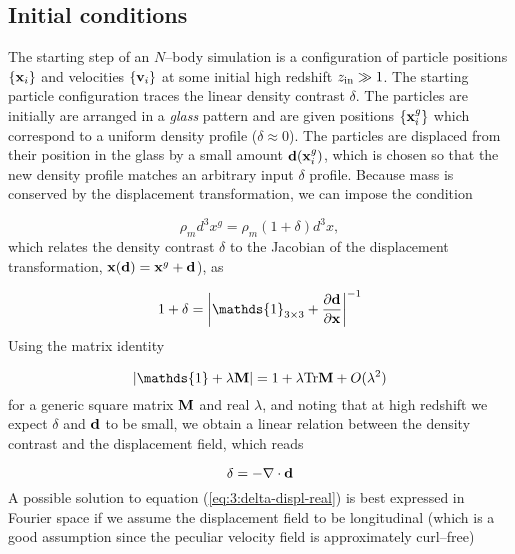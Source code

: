 \subsection{Initial conditions}
The starting step of an $N$--body simulation is a configuration of particle positions $\{\mathbf{x}_i\}$ and velocities $\{\mathbf{v}_i\}$ at some initial high redshift $z_{\rm in}\gg 1$. The starting particle configuration traces the linear density contrast $\delta$. The particles are initially are arranged in a \textit{glass} pattern and are given positions $\{\mathbf{x}_i^g\}$ which correspond to a uniform density profile ($\delta\approx0$). The particles are displaced from their position in the glass by a small amount $\mathbf{d}(\mathbf{x}_i^g)$, which is chosen so that the new density profile matches an arbitrary input $\delta$ profile. Because mass is conserved by the displacement transformation, we can impose the condition

\begin{equation}
\label{eq:3:masscons}
\rho_m d^3 x^g = \rho_m(1+\delta)d^3x,
\end{equation} 
%
which relates the density contrast $\delta$ to the Jacobian of the displacement transformation, $\mathbf{x}(\mathbf{d}) = \mathbf{x}^g+\mathbf{d}$), as 

\begin{equation}
\label{eq:3:delta-displ}
1+\delta = \left\vert\mathds{1}_{3\times 3}+\frac{\partial \bb{d}}{\partial \bb{x}}\right\vert^{-1}
\end{equation}
%
Using the matrix identity

\begin{equation}
\label{eq:3:det-identity}
\vert\mathds{1}+\lambda\bb{M}\vert = 1 + \lambda\Tr\bb{M} + O(\lambda^2)
\end{equation}
%
for a generic square matrix $\mathbf{M}$ and real $\lambda$, and noting that at high redshift we expect $\delta$ and $\mathbf{d}$ to be small, we obtain a linear relation between the density contrast and the displacement field, which reads 

\begin{equation}
\label{eq:3:delta-displ-real}
\delta = -\nabla\cdot\mathbf{d}
\end{equation}
%
A possible solution to equation (\ref{eq:3:delta-displ-real}) is best expressed in Fourier space if we assume the displacement field to be longitudinal (which is a good assumption since the peculiar velocity field is approximately curl--free)

